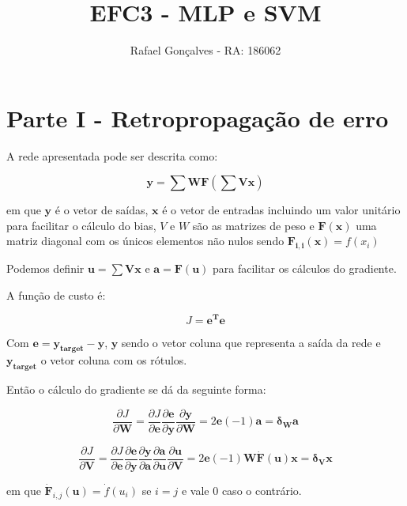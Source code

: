 \documentclass[a4paper, 12pt]{article}
\title{EFC3 - MLP e SVM}
\author{Rafael Gonçalves - RA: 186062}
\begin{document}
\maketitle

\section*{Parte I - Retropropagação de erro}

A rede apresentada pode ser descrita como:

\begin{equation}
    \mathbf{y} = \sum\mathbf{W}\mathbf{F}\left (\sum\mathbf{V}\mathbf{x}\right )
\end{equation}

em que $\mathbf{y}$ é o vetor de saídas, $\mathbf{x}$ é o vetor de entradas incluindo um valor unitário para facilitar o cálculo do bias, $V$ e $W$ são as matrizes de peso e $\mathbf{F}(\mathbf{x})$ uma matriz diagonal com os únicos elementos não nulos sendo $\mathbf{F_{i,i}}(\mathbf{x}) = f(x_i)$

Podemos definir $\mathbf{u} = \sum\mathbf{Vx}$ e $\mathbf{a} = \mathbf{F}(\mathbf{u})$ para facilitar os cálculos do gradiente.

A função de custo é:

\begin{equation}
    J = \mathbf{e^Te}
\end{equation}

Com $\mathbf{e} = {\mathbf{y_{target}} - \mathbf{y}}$, $\mathbf{y}$ sendo o vetor coluna que representa a saída da rede e $\mathbf{y_{target}}$ o vetor coluna com os rótulos.

Então o cálculo do gradiente se dá da seguinte forma:

\[
    \frac{\partial J}{\partial \mathbf{W}} = \frac{\partial J}{\partial \mathbf{e}}\frac{\partial\mathbf{e}}{\partial\mathbf{y}}\frac{\partial\mathbf{y}}{\partial\mathbf{W}} = 2\mathbf{e}(-1)\mathbf{a} = \boldsymbol{\delta _W} \mathbf{a}
\]

\[
    \frac{\partial J}{\partial \mathbf{V}} = \frac{\partial J}{\partial \mathbf{e}}\frac{\partial\mathbf{e}}{\partial\mathbf{y}}\frac{\partial\mathbf{y}}{\partial\mathbf{a}}\frac{\partial\mathbf{a}}{\partial\mathbf{u}}\frac{\partial\mathbf{u}}{\partial\mathbf{V}} = 2\mathbf{e}(-1)\mathbf{W}\mathbf{\dot{F}}(\mathbf{u})\mathbf{x} = \boldsymbol{\delta _V} \mathbf{x}
\] 

\vspace{1em}
em que $\dot{\mathbf{F}}_{i,j}(\mathbf{u}) = \dot{f}(u_i)$ se $i = j$ e vale $0$ caso o contrário.
\end{document}
